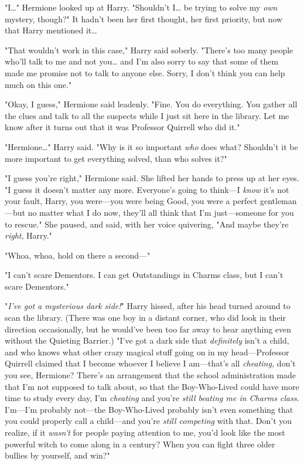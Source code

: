 "I{\ldots}" Hermione looked up at Harry. "Shouldn't I{\ldots} be trying to 
solve my \emph{own} mystery, though?" It hadn't been her first thought, her 
first priority, but now that Harry mentioned it{\ldots}

"That wouldn't work in this case," Harry said soberly. "There's too many people 
who'll talk to me and not you{\ldots} and I'm also sorry to say that some of 
them made me promise not to talk to anyone else. Sorry, I don't think you can 
help much on this one."

"Okay, I guess," Hermione said leadenly. "Fine. You do everything. You gather 
all the clues and talk to all the suspects while I just sit here in the 
library. Let me know after it turns out that it was Professor Quirrell who did 
it."

"Hermione{\ldots}" Harry said. "Why is it so important \emph{who} does what? 
Shouldn't it be more important to get everything solved, than who solves it?"

"I guess you're right," Hermione said. She lifted her hands to press up at her 
eyes. "I guess it doesn't matter any more. Everyone's going to think---I 
\emph{know} it's not your fault, Harry, you were---you were being Good, you 
were a perfect gentleman---but no matter what I do now, they'll all think that 
I'm just---someone for you to rescue." She paused, and said, with her voice 
quivering, "And maybe they're \emph{right}, Harry."

"Whoa, whoa, hold on there a second---"

"I can't scare Dementors. I can get Outstandings in Charms class, but I can't 
scare Dementors."

"\emph{I've got a mysterious dark side!}" Harry hissed, after his head turned 
around to scan the library. (There was one boy in a distant corner, who did 
look in their direction occasionally, but he would've been too far away to hear 
anything even without the Quieting Barrier.) "I've got a dark side that 
\emph{definitely} isn't a child, and who knows what other crazy magical stuff 
going on in my head---Professor Quirrell claimed that I become whoever I 
believe I am---that's all \emph{cheating,} don't you see, Hermione? There's an 
arrangement that the school administration made that I'm not supposed to talk 
about, so that the Boy-Who-Lived could have more time to study every day, I'm 
\emph{cheating} and you're \emph{still beating me in Charms class.} I'm---I'm 
probably not---the Boy-Who-Lived probably isn't even something that you could 
properly call a child---and you're \emph{still competing} with that. Don't you 
realize, if it \emph{wasn't} for people paying attention to me, you'd look like 
the most powerful witch to come along in a century? When you can fight three 
older bullies by yourself, and win?"

